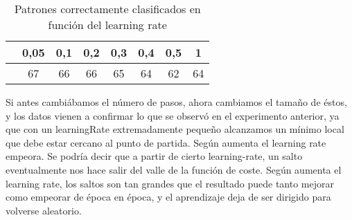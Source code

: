 \begin{table}[ht]
    \centering
    \begin{tabular}{|r|c|c|c|c|c|c|c|}
    \hline
    \cellcolor[HTML]{9B9B9B}{\color[HTML]{FFFFFF} Learning Rate} & 0,05  & 0,1 & 0,2 & 0,3 & 0,4 & 0,5 & 1 \\ \hline
    \cellcolor[HTML]{9B9B9B}{\color[HTML]{FFFFFF} PCC} & 67 & 66 & 66 & 65 & 64 & 62 & 64 \\ \hline
    \end{tabular}
    \caption{Patrones correctamente clasificados en función del learning rate}
    \label{cuadro:variaciones-learning-rate}
\end{table}

Si antes cambiábamos el número de pasos, ahora cambiamos el tamaño de éstos, y los datos vienen a confirmar lo que se observó en el experimento anterior, ya que con un learningRate extremadamente pequeño alcanzamos un mínimo local que debe estar cercano al punto de partida. Según aumenta el learning rate empeora. Se podría decir que a partir de cierto learning-rate, un salto eventualmente nos hace salir del valle de la función de coste. Según aumenta el learning rate, los saltos son tan grandes que el resultado puede tanto mejorar como empeorar de época en época, y el aprendizaje deja de ser dirigido para volverse aleatorio.